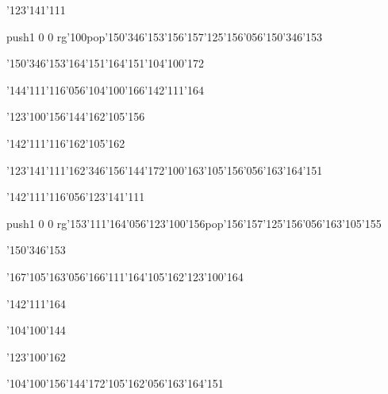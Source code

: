 \null\vfill\ipa\centerline{\enskip\enskip\enskip\enskip\char'123\char'141\char'111\enskip\enskip\enskip\enskip}\medskip\centerline{\enskip\enskip\enskip\enskip\pdfcolorstack\match push{1 0 0 rg}\char'100\pdfcolorstack\match pop{}\enskip\char'150\char'346\char'153\enskip\enskip\enskip\enskip\enskip\char'156\char'157\char'125\char'156\char'056\char'150\char'346\char'153}\medskip\centerline{\enskip\char'150\char'346\char'153\enskip\enskip\enskip\enskip\char'164\char'151\enskip\char'164\char'151\enskip\char'104\char'100\char'172}\medskip\centerline{\enskip\char'144\char'111\char'116\char'056\char'104\char'100\char'166\enskip\enskip\enskip\enskip\enskip\enskip\char'142\char'111\char'164}\medskip\centerline{\enskip\enskip\enskip\enskip\enskip\enskip\enskip\enskip\enskip\enskip\enskip\enskip\enskip\enskip}\medskip\centerline{\enskip\enskip\enskip\enskip\enskip\char'123\char'100\char'156\char'144\enskip\enskip\enskip\enskip\char'162\char'105\char'156}\medskip\centerline{\enskip\enskip\enskip\enskip\enskip\enskip\enskip\char'142\char'111\char'116\enskip\char'162\char'105\char'162}\medskip\centerline{\enskip\char'123\char'141\char'111\enskip\char'162\char'346\char'156\char'144\char'172\enskip\char'100\char'163\enskip\char'105\char'156\char'056\char'163\char'164\char'151}\medskip\vfill\footline{\hfil\tt\folio\hfil}\eject
\null\vfill\ipa\centerline{\enskip\char'142\char'111\char'116\char'056\char'123\char'141\char'111\enskip\enskip\enskip\enskip}\medskip\centerline{\enskip\enskip\enskip\enskip\enskip\enskip\pdfcolorstack\match push{1 0 0 rg}\char'153\char'111\char'164\char'056\char'123\char'100\char'156\pdfcolorstack\match pop{}\enskip\char'156\char'157\char'125\char'156\char'056\char'163\char'105\char'155}\medskip\centerline{\enskip\char'150\char'346\char'153\enskip\enskip\enskip\enskip\enskip\enskip\enskip\enskip\enskip\enskip\enskip\enskip\enskip}\medskip\centerline{\enskip\char'167\char'105\char'163\char'056\char'166\char'111\char'164\enskip\char'105\char'162\enskip\enskip\enskip\char'123\char'100\char'164}\medskip\centerline{\enskip\enskip\enskip\enskip\enskip\enskip\enskip\enskip\enskip\enskip\enskip\char'142\char'111\char'164}\medskip\centerline{\enskip\enskip\enskip\enskip\enskip\enskip\enskip\enskip\enskip\char'104\char'100\char'144\enskip\enskip\enskip\enskip}\medskip\centerline{\enskip\enskip\enskip\enskip\enskip\enskip\enskip\enskip\enskip\enskip\enskip\char'123\char'100\char'162}\medskip\centerline{\enskip\enskip\enskip\enskip\enskip\char'104\char'100\char'156\char'144\char'172\enskip\enskip\enskip\enskip\char'105\char'162\char'056\char'163\char'164\char'151}\medskip\vfill\footline{\hfil\tt\folio\hfil}\eject
